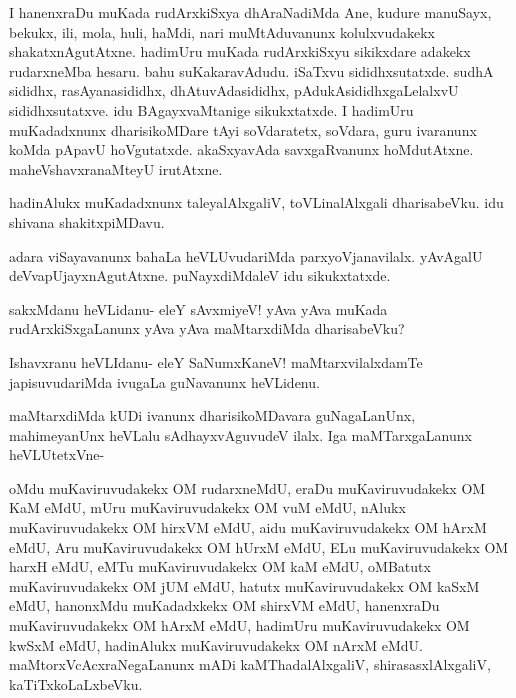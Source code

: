 \documentclass{article}
\begin{document}
\begin{mng}%
I hanenxraDu muKada rudArxkiSxya dhAraNadiMda Ane, kudure manuSayx, 
bekukx, ili, mola, huli, haMdi, nari muMtAduvanunx kolulxvudakekx 
shakatxnAgutAtxne. hadimUru muKada rudArxkiSxyu sikikxdare adakekx 
rudarxneMba hesaru. bahu suKakaravAdudu. iSaTxvu sididhxsutatxde. 
sudhA sididhx, rasAyanasididhx, dhAtuvAdasididhx, 
pAdukAsididhxgaLelalxvU sididhxsutatxve. idu BAgayxvaMtanige 
sikukxtatxde. I hadimUru muKadadxnunx dharisikoMDare tAyi soVdaratetx, 
soVdara, guru ivaranunx koMda pApavU hoVgutatxde. akaSxyavAda 
savxgaRvanunx hoMdutAtxne. maheVshavxranaMteyU irutAtxne.
\end{mng}

\begin{mng}%
hadinAlukx muKadadxnunx taleyalAlxgaliV, toVLinalAlxgali dharisabeVku. 
idu shivana shakitxpiMDavu.
\end{mng}

\begin{mng}%
adara viSayavanunx bahaLa heVLUvudariMda parxyoVjanavilalx. yAvAgalU 
deVvapUjayxnAgutAtxne. puNayxdiMdaleV idu sikukxtatxde.
\end{mng}

\begin{mng}%
sakxMdanu heVLidanu- eleY sAvxmiyeV! yAva yAva muKada 
rudArxkiSxgaLanunx yAva yAva maMtarxdiMda dharisabeVku?
\end{mng}

\begin{mng}%
Ishavxranu heVLIdanu- eleY SaNumxKaneV! maMtarxvilalxdamTe 
japisuvudariMda ivugaLa guNavanunx heVLidenu.
\end{mng}

\begin{mng}%
maMtarxdiMda kUDi ivanunx dharisikoMDavara guNagaLanUnx, mahimeyanUnx 
heVLalu sAdhayxvAguvudeV ilalx. Iga maMTarxgaLanunx heVLUtetxVne-

oMdu muKaviruvudakekx OM rudarxneMdU, eraDu muKaviruvudakekx OM KaM 
eMdU, mUru muKaviruvudakekx OM vuM eMdU, nAlukx muKaviruvudakekx OM 
hirxVM eMdU, aidu muKaviruvudakekx OM hArxM eMdU, Aru muKaviruvudakekx 
OM hUrxM eMdU, ELu muKaviruvudakekx OM harxH eMdU, eMTu 
muKaviruvudakekx OM kaM eMdU, oMBatutx muKaviruvudakekx OM jUM eMdU, 
hatutx muKaviruvudakekx OM kaSxM eMdU, hanonxMdu muKadadxkekx OM 
shirxVM eMdU, hanenxraDu muKaviruvudakekx OM hArxM eMdU, hadimUru 
muKaviruvudakekx OM kwSxM eMdU, hadinAlukx muKaviruvudakekx OM nArxM 
eMdU. maMtorxVcAcxraNegaLanunx mADi kaMThadalAlxgaliV, 
shirasasxlAlxgaliV, kaTiTxkoLaLxbeVku.
\end{mng}
\end{document}
